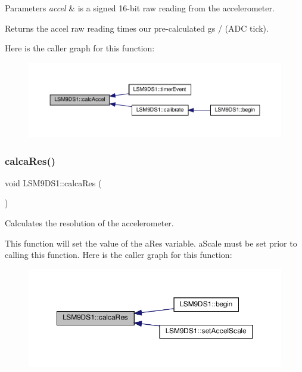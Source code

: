 \begin{DoxyParams}{Parameters}
{\em accel} & is a signed 16-\/bit raw reading from the accelerometer. \\
\hline
\end{DoxyParams}
\begin{DoxyReturn}{Returns}
the accel raw reading times our pre-\/calculated g\textquotesingle{}s / (A\+DC tick). 
\end{DoxyReturn}
Here is the caller graph for this function\+:\nopagebreak
\begin{figure}[H]
\begin{center}
\leavevmode
\includegraphics[width=350pt]{classLSM9DS1_a54e2a7888b67b47cf0dd986c5b91a3c5_icgraph}
\end{center}
\end{figure}
\mbox{\label{classLSM9DS1_a31597c9ae6c5a7de64a50cbbbcd24297}} 
\subsubsection{\texorpdfstring{calca\+Res()}{calcaRes()}}
{\footnotesize\ttfamily void L\+S\+M9\+D\+S1\+::calca\+Res (\begin{DoxyParamCaption}{ }\end{DoxyParamCaption})\hspace{0.3cm}{\ttfamily [protected]}}



Calculates the resolution of the accelerometer. 

This function will set the value of the a\+Res variable. a\+Scale must be set prior to calling this function. Here is the caller graph for this function\+:\nopagebreak
\begin{figure}[H]
\begin{center}
\leavevmode
\includegraphics[width=350pt]{classLSM9DS1_a31597c9ae6c5a7de64a50cbbbcd24297_icgraph}
\end{center}
\end{figure}
\mbox{\label{classLSM9DS1_a303e0dd33e000579dc3917aecedb6e63}} 
